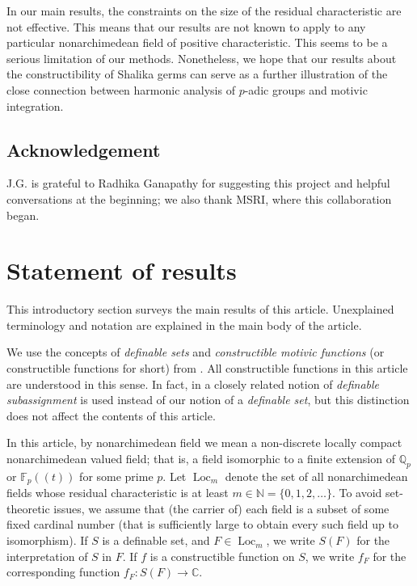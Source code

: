 \documentclass[12pt]{amsart}
\newcommand{\op}[1]{\operatorname{#1}}
\newcommand{\ring}[1]{{\mathbb #1}}
\theoremstyle{plain}
\theoremstyle{definition}
\begin{document}
In our main results, the constraints on the size of the residual
characteristic are not effective.  This means that our results are not
known to apply to any particular nonarchimedean field of positive
characteristic. This seems to be a serious limitation of our methods.
Nonetheless, we hope that our results about the constructibility of
Shalika germs can serve as a further illustration of the close
connection between harmonic analysis of $p$-adic groups and motivic
integration.

\subsection{Acknowledgement} J.G. is grateful to Radhika Ganapathy for
suggesting this project and helpful conversations at the beginning; we
also thank MSRI, where this collaboration began.

\section{Statement of results}


This introductory section surveys the main results of this article.
Unexplained terminology and notation are explained in the main body of
the article.  

We use the concepts of {\it definable sets} and {\it constructible
  motivic functions} (or constructible functions for short) from
\cite{CL}.  All constructible functions in this article are understood
in this sense. In fact, in \cite{CL} a closely related notion of
\emph{definable subassignment} is used instead of our notion of a
\emph{definable set}, but this distinction does not affect the
contents of this article.

In this article, by nonarchimedean field we mean a non-discrete
locally compact nonarchimedean valued field; that is, a field
isomorphic to a finite extension of $\ring{Q}_p$ or $\ring{F}_p(\!(t)\!)$
for some prime $p$.  Let $\op{Loc}_m$ denote the set of all
nonarchimedean fields whose residual characteristic is at least
$m\in \ring{N}=\{0,1,2,\ldots\}$.  To avoid set-theoretic issues, we
assume that (the carrier of) each field is a subset of some fixed
cardinal number (that is sufficiently large to obtain every such field
up to isomorphism).  If $S$ is a definable set, and $F\in \op{Loc}_m$,
we write $S(F)$ for the interpretation of $S$ in $F$.  If $f$ is a
constructible function on $S$, we write $f_F$ for the corresponding
function $f_F:S(F)\to \ring{C}$.
\end{document}
